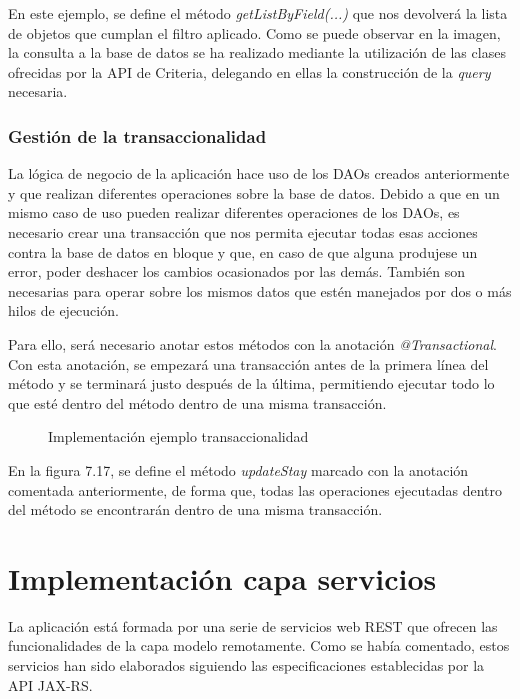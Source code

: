En este ejemplo, se define el método \textit{getListByField(...)} que nos devolverá la lista de objetos que cumplan el filtro aplicado. Como se puede observar en la imagen, la consulta a la base de datos se ha realizado mediante la utilización de las clases ofrecidas por la API de Criteria, delegando en ellas la construcción de la \textit{query} necesaria.


\subsubsection*{Gestión de la transaccionalidad}
La lógica de negocio de la aplicación hace uso de los DAOs creados anteriormente y que realizan diferentes operaciones sobre la base de datos. Debido a que en un mismo caso de uso pueden realizar diferentes operaciones de los DAOs, es necesario crear una transacción que nos permita ejecutar todas esas acciones contra la base de datos en bloque y que, en caso de que alguna produjese un error, poder deshacer los cambios ocasionados por las demás. También son necesarias para operar sobre los mismos datos que estén manejados por dos o más hilos de ejecución.

Para ello, será necesario anotar estos métodos con la anotación \textit{@Transactional}. Con esta anotación, se empezará una transacción antes de la primera línea del método y se terminará justo después de la última, permitiendo ejecutar todo lo que esté dentro del método dentro de una misma transacción.

\begin{figure}[H]
\centering
{}
\caption{Implementación ejemplo transaccionalidad}
\end{figure}

En la figura 7.17, se define el método \textit{updateStay} marcado con la anotación comentada anteriormente, de forma que, todas las operaciones ejecutadas dentro del método se encontrarán dentro de una misma transacción. 


\section{Implementación capa servicios}
La aplicación está formada por una serie de servicios web REST que ofrecen las funcionalidades de la capa modelo remotamente. Como se había comentado, estos servicios han sido elaborados siguiendo las especificaciones establecidas por la API JAX-RS.

